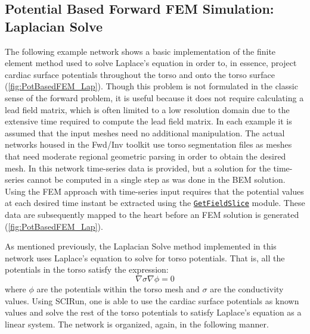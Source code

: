 \subsection{Potential Based Forward FEM Simulation: Laplacian Solve}

The following example network shows a basic implementation of the finite element method used to solve Laplace's equation in order to, in essence, project cardiac surface potentials throughout the torso and onto the torso surface (\autoref{fig:PotBasedFEM_Lap}).
Though this problem is not formulated in the classic sense of the forward problem, it is useful because it does not require calculating a lead field matrix, which is often limited to a low resolution domain due to the extensive time required to compute the lead field matrix.
In each example it is assumed that the input meshes need no additional manipulation.
The actual networks housed in the Fwd/Inv toolkit use torso segmentation files as meshes that need moderate regional geometric parsing in order to obtain the desired mesh.
In this network time-series data is provided, but a solution for the time-series cannot be computed in a single step as was done in the BEM solution.
Using the FEM approach with time-series input requires that the potential values at each desired time instant be extracted using the \href{http://sciinstitute.github.io/scirun.pages/modules.html#GetFieldSlice}{\tt GetFieldSlice} module.
These data are subsequently mapped to the heart before an FEM solution is generated (\autoref{fig:PotBasedFEM_Lap}).

As mentioned previously, the Laplacian Solve method implemented in this network uses Laplace's equation to solve for torso potentials. That is, all the potentials in the torso satisfy the expression:
\begin{equation*}
\nabla \sigma \nabla \phi = 0
\end{equation*}
\noindent where $\phi$ are the potentials within the torso mesh and $\sigma$ are the conductivity values. Using SCIRun, one is able to use the cardiac surface potentials as known values and solve the rest of the torso potentials to satisfy Laplace's equation as a linear system.
The network is organized, again, in the following manner.



